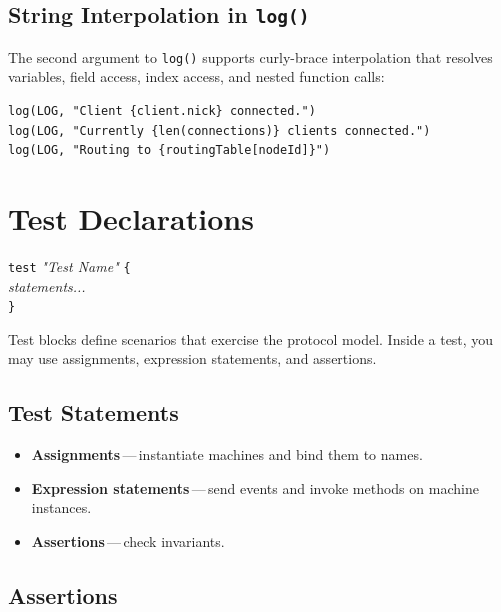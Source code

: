 \documentclass[11pt,letterpaper]{article}
\begin{document}
\subsection{String Interpolation in \texttt{log()}}

The second argument to \lstinline{log()} supports curly-brace
interpolation that resolves variables, field access, index access, and
nested function calls:

\begin{lstlisting}[numbers=none]
log(LOG, "Client {client.nick} connected.")
log(LOG, "Currently {len(connections)} clients connected.")
log(LOG, "Routing to {routingTable[nodeId]}")
\end{lstlisting}


\section{Test Declarations}
\label{sec:tests}

\begin{syntaxbox}[test]
\texttt{test} \textit{"Test Name"} \texttt{\{} \\
\hspace*{2em}\textit{statements...} \\
\texttt{\}}
\end{syntaxbox}

Test blocks define scenarios that exercise the protocol model.  Inside a
test, you may use assignments, expression statements, and assertions.

\subsection{Test Statements}

\begin{itemize}[leftmargin=1.5em]
  \item \textbf{Assignments}\,---\,instantiate machines and bind them to
        names.
  \item \textbf{Expression statements}\,---\,send events and invoke
        methods on machine instances.
  \item \textbf{Assertions}\,---\,check invariants.
\end{itemize}

\subsection{Assertions}
\end{document}
